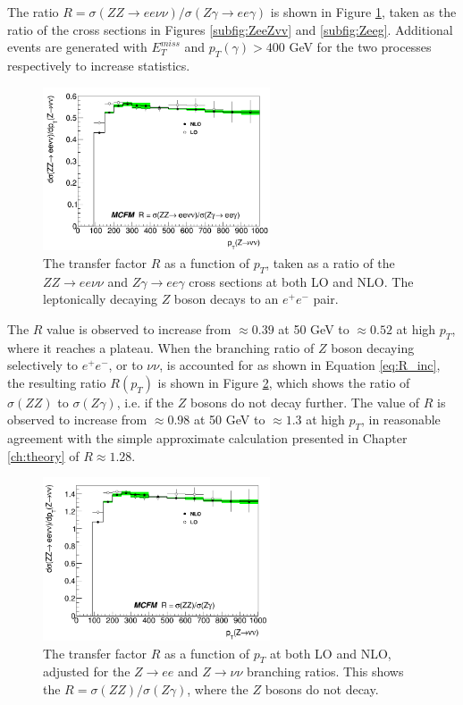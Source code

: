 \documentclass[11pt,a4paper,openright,twoside]{report}
\newcommand{\met}{$E_T^{miss}$ }
\begin{document}
The ratio $R = \sigma(ZZ\rightarrow ee\nu\nu)/\sigma(Z\gamma\rightarrow ee\gamma)$ is shown in Figure \ref{fig:Rcurve}, taken as the ratio of the cross sections in Figures \ref{subfig:ZeeZvv} and \ref{subfig:Zeeg}. Additional events are generated with \met and $p_T(\gamma) > 400$ GeV for the two processes respectively to increase statistics. 
\begin{figure}[H]
	\centering
	\includegraphics[width= 0.6\textwidth]{R.png}
	\caption{The transfer factor $R$ as a function of $p_T$, taken as a ratio of  the $ZZ\to ee\nu\nu$ and $Z\gamma\to ee\gamma$ cross sections at both LO and NLO. The leptonically decaying $Z$ boson decays to an $e^+e^-$ pair.}
	\label{fig:Rcurve}
\end{figure}
The $R$ value is observed to increase from $\approx 0.39$ at 50 GeV to $\approx 0.52$ at high $p_T$, where it reaches a plateau. When the branching ratio of $Z$ boson decaying selectively to $e^+e^-$, or to $\nu\nu$, is accounted for as shown in Equation \ref{eq:R_inc}, the resulting ratio $R(p_T)$ is shown in Figure \ref{fig:RcurveBR}, which shows the ratio of $\sigma(ZZ)$ to $\sigma(Z\gamma)$, i.e. if the $Z$ bosons do not decay further. The value of $R$ is observed to increase from $\approx 0.98$ at 50 GeV to $\approx 1.3$ at high $p_T$, in reasonable agreement with the simple approximate calculation presented in Chapter \ref{ch:theory} of $R \approx 1.28$.
\begin{figure}[H]
	\centering
	\includegraphics[width = 0.6\textwidth]{R_BR.png}
	\caption{The transfer factor $R$ as a function of $p_T$ at both LO and NLO, adjusted for the $Z\rightarrow ee$ and $Z\rightarrow \nu\nu$ branching ratios. This shows the $R=\sigma(ZZ)/\sigma(Z\gamma)$, where the $Z$ bosons do not decay.}
	\label{fig:RcurveBR}
\end{figure}
\end{document}

